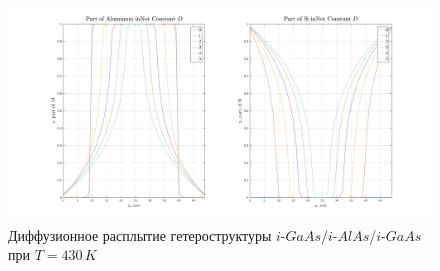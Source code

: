 \begin{figure}[h!]
	\centering
	\includegraphics[width=0.9\linewidth]{assets/DSi}
	\caption{Диффузионное расплытие гетероструктуры $i$-$GaAs$/$i$-$AlAs$/$i$-$GaAs$ при $T = 430\,K$}
	\label{fig:DSi}
\end{figure}